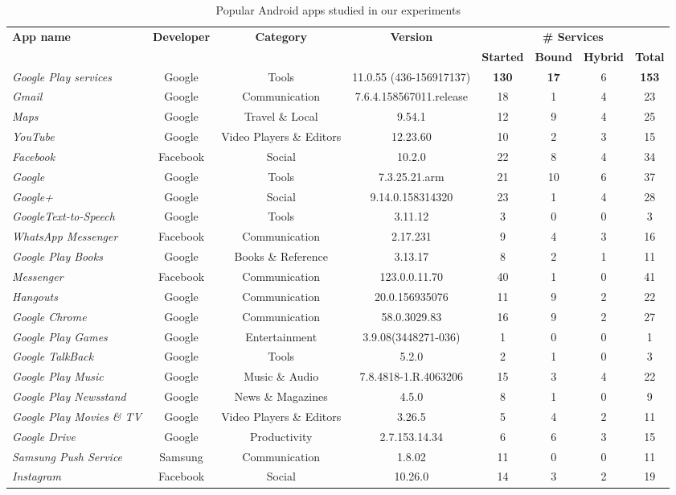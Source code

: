 \documentclass[sigconf,review, anonymous]{acmart}
\begin{document}
\begin{table}
\centering
\small
\caption{Popular Android apps studied in our experiments}
\begin{tabular}{|l|c|c|c|cccc|}\hline
{\bf App name}&{\bf Developer}&{\bf Category}&{\bf Version}&\multicolumn{4}{|c|}{\textbf{\#  Services}}\\
&  & & &{\bf Started}&{\bf Bound}&{\bf Hybrid} &{\bf Total}\\\hline
\hline
{\it Google Play services}&Google&Tools&11.0.55 (436-156917137)&{\bf 130}&{\bf 17}&6&{\bf 153}\\
{\it Gmail}&Google&Communication&7.6.4.158567011.release&18&1&4&23\\
{\it Maps}&Google&Travel \& Local&9.54.1&12&9&4&25\\
{\it YouTube}&Google&Video Players \& Editors&12.23.60&10&2&3&15\\
{\it Facebook}&Facebook&Social&10.2.0&22&8&4&34\\
{\it Google}&Google&Tools&7.3.25.21.arm&21&10&6&37\\
{\it Google+}&Google&Social&9.14.0.158314320&23&1&4&28\\
{\it GoogleText-to-Speech}&Google&Tools&3.11.12&3&0&0&3\\
{\it WhatsApp Messenger}&Facebook&Communication&2.17.231&9&4&3&16\\
{\it Google Play Books}&Google&Books \& Reference&3.13.17&8&2&1&11\\
{\it Messenger}&Facebook&Communication&123.0.0.11.70&40&1&0&41\\
{\it Hangouts}&Google&Communication&20.0.156935076&11&9&2&22\\
{\it Google Chrome}&Google&Communication&58.0.3029.83&16&9&2&27\\
{\it Google Play Games}&Google&Entertainment&3.9.08(3448271-036)&1&0&0&1\\
{\it Google TalkBack}&Google&Tools&5.2.0&2&1&0&3\\
{\it Google Play Music}&Google&Music \& Audio&7.8.4818-1.R.4063206&15&3&4&22\\
{\it Google Play Newsstand}&Google&News \& Magazines&4.5.0&8&1&0&9\\
{\it Google Play Movies \& TV}&Google&Video Players \& Editors&3.26.5&5&4&2&11\\
{\it Google Drive}&Google&Productivity&2.7.153.14.34&6&6&3&15\\
{\it Samsung Push Service}&Samsung&Communication&1.8.02&11&0&0&11\\
{\it Instagram}&Facebook&Social&10.26.0&14&3&2&19\\

\end{tabular}
\end{table}
\end{document}
